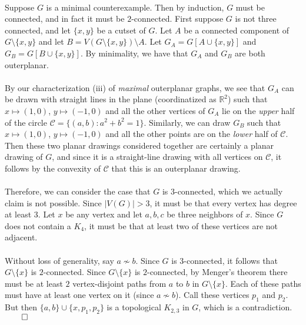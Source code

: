 \documentclass[10pt,a4paper]{article}
\newcommand{\R}{\mathbb{R}}
\newcommand{\Cee}{\mathcal{C}}
\newcommand{\1}{\mathbf{1}}
\begin{document}
\paragraph*{}Suppose $G$ is a minimal counterexample.  Then by induction, $G$ must be connected, and in fact it must be $2$-connected.  First suppose $G$ is not three connected, and let $\{x, y\}$ be a cutset of $G$.  Let $A$ be a connected component of $G \setminus \{x,y\}$ and let $B = V(G \setminus \{x,y\}) \setminus A$.  Let $G_{A} = G[A \cup \{x,y\}]$ and $G_{B} = G[B \cup \{x,y\}]$.  By minimality, we have that $G_A$ and $G_B$ are both outerplanar.
\paragraph*{}By our characterization (iii) of \textit{maximal} outerplanar graphs, we see that $G_{A}$ can be drawn with straight lines in the plane (coordinatized as $\R ^2$) such that $x \mapsto (1,0)$, $y \mapsto (-1,0)$ and all the other vertices of $G_{A}$ lie on the \textit{upper} half of the circle $\Cee = \{(a,b) : a^2 + b^2 = 1\}$.  Similarly, we can draw $G_{B}$ such that $x \mapsto (1,0)$, $y \mapsto (-1, 0)$ and all the other points are on the \textit{lower} half of $\Cee$.  Then these two planar drawings considered together are certainly a planar drawing of $G$, and since it is a straight-line drawing with all vertices on $\Cee$, it follows by the convexity of $\Cee$ that this is an outerplanar drawing.
\paragraph*{}Therefore, we can consider the case that $G$ is $3$-connected, which we actually claim is not possible.  Since $|V(G)| > 3$, it must be that every vertex has degree at least $3$.  Let $x$ be any vertex and let $a, b, c$ be three neighbors of $x$.  Since $G$ does not contain a $K_4$, it must be that at least two of these vertices are not adjacent.
\paragraph*{}Without loss of generality, say $a \not \sim b$.  Since $G$ is $3$-connected, it follows that $G \setminus \{x\}$ is $2$-connected.  Since $G \setminus \{x\}$ is $2$-connected, by Menger's theorem there must be at least $2$ vertex-disjoint paths from $a$ to $b$ in $G \setminus \{x\}$.  Each of these paths must have at least one vertex on it (since $a \not \sim b$).  Call these vertices $p_1$ and $p_2$.  But then $\{a, b\} \cup \{x, p_1, p_2\}$ is a topological $K_{2,3}$ in $G$, which is a contradiction.  $\qed$
\end{document}
